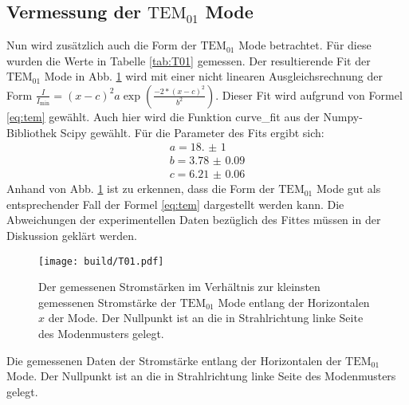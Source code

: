 \subsection{Vermessung der $\text{TEM}_{01}$ Mode}
Nun wird zusätzlich auch die Form der $\text{TEM}_\text{01}$ Mode betrachtet. Für diese wurden die Werte in Tabelle \ref{tab:T01} gemessen. 
Der resultierende Fit der $\text{TEM}_\text{01}$ Mode in Abb. \ref{fig:T01} wird mit einer nicht linearen Ausgleichsrechnung der Form $\frac{I}{I_\text{min}} =  (x-c)^2 a \exp \left( \frac{-2*(x-c)^2}{b^2}\right)$. Dieser Fit wird aufgrund von Formel \eqref{eq:tem} gewählt. Auch hier wird die Funktion curve\_fit aus der Numpy-Bibliothek Scipy \cite{scipy} gewählt. Für die Parameter des Fits ergibt sich:
\begin{gather*}
a = \num{18.(1)}\\
b = \num{3.78(9)}\\
c = \num{6.21(6)}
\end{gather*}
Anhand von Abb. \ref{fig:T01} ist zu erkennen, dass die Form der $\text{TEM}_\text{01}$ Mode gut als entsprechender Fall der Formel \eqref{eq:tem} dargestellt werden kann. Die Abweichungen der experimentellen Daten bezüglich des Fittes müssen in der Diskussion geklärt werden.

\begin{figure}
	\centering
	\texttt{[image: build/T01.pdf]}
	\caption{Der gemessenen Stromstärken im Verhältnis zur kleinsten gemessenen Stromstärke der $\text{TEM}_{01}$ Mode entlang der Horizontalen $x$ der Mode. Der Nullpunkt ist an die in Strahlrichtung linke Seite des Modenmusters gelegt.}
	\label{fig:T01}
\end{figure}

\begin{table}
	\centering
	\caption{Die gemessenen Daten der Stromstärke entlang der Horizontalen der $\text{TEM}_{\text{01}}$ Mode. Der Nullpunkt ist an die in Strahlrichtung linke Seite des Modenmusters gelegt.}
	
	
	\label{tab:T01}
\end{table}

